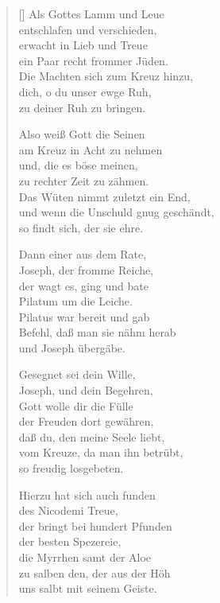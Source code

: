 \begin{multicols}{2}
\settowidth{\versewidth}{und wenn die Unschuld gnug geschändt,}
\begin{verse}[\versewidth]
 Als Gottes Lamm und Leue\\
entschlafen und verschieden,\\
erwacht in Lieb und Treue\\
ein Paar recht frommer Jüden.\\
Die Machten sich zum Kreuz hinzu,\\
dich, o du unser ewge Ruh,\\
zu deiner Ruh zu bringen.

 Also weiß Gott die Seinen\\
am Kreuz in Acht zu nehmen\\
und, die es böse meinen,\\
zu rechter Zeit zu zähmen.\\
Das Wüten nimmt zuletzt ein End,\\
und wenn die Unschuld gnug geschändt,\\
so findt sich, der sie ehre.

 Dann einer aus dem Rate,\\
Joseph, der fromme Reiche,\\
der wagt es, ging und bate\\
Pilatum um die Leiche.\\
Pilatus war bereit und gab\\
Befehl, daß man sie nähm herab\\
und Joseph übergäbe.

 Gesegnet sei dein Wille,\\
Joseph, und dein Begehren,\\
Gott wolle dir die Fülle\\
der Freuden dort gewähren,\\
daß du, den meine Seele liebt,\\
vom Kreuze, da man ihn betrübt,\\
so freudig losgebeten.

 Hierzu hat sich auch funden\\
des Nicodemi Treue,\\
der bringt bei hundert Pfunden\\
der besten Spezereie,\\
die Myrrhen samt der Aloe\\
zu salben den, der aus der Höh\\
uns salbt mit seinem Geiste.


\end{verse}
\end{multicols}
